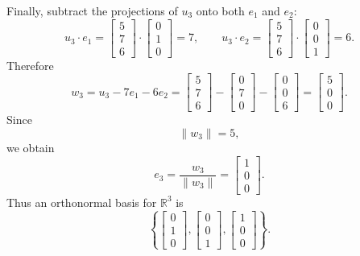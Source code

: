 \documentclass[12pt]{article}
\newcommand{\R}{\mathbb{R}}
\begin{document}
Finally, subtract the projections of $u_3$ onto both $e_1$ and $e_2$:
\[
u_3\cdot e_1=
\begin{bmatrix}5\\7\\6\end{bmatrix}\cdot
\begin{bmatrix}0\\1\\0\end{bmatrix}=7,
\qquad
u_3\cdot e_2=
\begin{bmatrix}5\\7\\6\end{bmatrix}\cdot
\begin{bmatrix}0\\0\\1\end{bmatrix}=6.
\]
Therefore
\[
w_3=u_3-7e_1-6e_2
=\begin{bmatrix}5\\7\\6\end{bmatrix}
-\begin{bmatrix}0\\7\\0\end{bmatrix}
-\begin{bmatrix}0\\0\\6\end{bmatrix}
=\begin{bmatrix}5\\0\\0\end{bmatrix}.
\]
Since
\[
\|w_3\|=5,
\]
we obtain
\[
e_3=\frac{w_3}{\|w_3\|}
=\begin{bmatrix}1\\0\\0\end{bmatrix}.
\]
Thus an orthonormal basis for $\R^3$ is
\[
\boxed{\left\{
\begin{bmatrix}0\\1\\0\end{bmatrix},
\begin{bmatrix}0\\0\\1\end{bmatrix},
\begin{bmatrix}1\\0\\0\end{bmatrix}
\right\}.}
\]
\end{document}
